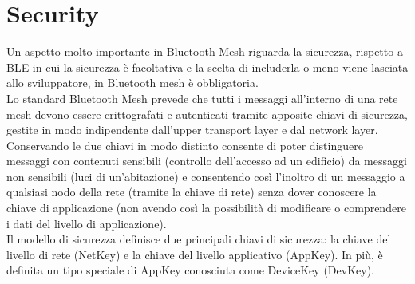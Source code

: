 \section{Security}
Un aspetto molto importante in Bluetooth Mesh riguarda la sicurezza, rispetto a BLE in cui la sicurezza è facoltativa e la scelta di includerla o meno viene lasciata allo sviluppatore, in Bluetooth mesh è obbligatoria.\\
Lo standard Bluetooth Mesh prevede che tutti i messaggi all'interno di una rete mesh devono essere crittografati e autenticati tramite apposite chiavi di sicurezza, gestite in modo indipendente dall'upper transport layer e dal network layer. \\
Conservando le due chiavi in modo distinto consente di poter distinguere messaggi con contenuti sensibili (controllo dell'accesso ad un edificio) da messaggi non sensibili (luci di un'abitazione) e consentendo così l'inoltro di un messaggio a qualsiasi nodo della rete (tramite la chiave di rete) senza dover conoscere la chiave di applicazione (non avendo così la possibilità di modificare o comprendere i dati del livello di applicazione).\\

\noindent Il modello di sicurezza definisce due principali chiavi di sicurezza: la chiave del livello di rete (NetKey) e la chiave del livello applicativo (AppKey). In più, è definita un tipo speciale di AppKey conosciuta come DeviceKey (DevKey).

